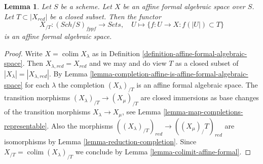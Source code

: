 \documentclass{stacks-project}
\theoremstyle{plain}
\newtheorem{lemma}[subsection]{Lemma}
\theoremstyle{definition}
\theoremstyle{remark}
\numberwithin{equation}{subsection}
\def\colim{\mathop{\mathrm{colim}}\nolimits}
\def\Sch{\mathit{Sch}}
\begin{document}
\begin{lemma}
\label{lemma-completion-affine-formal-is-affine-formal}
Let $S$ be a scheme. Let $X$ be an affine formal algebraic space over $S$.
Let $T \subset |X_{red}|$ be a closed subset. Then the functor
$$
X_{/T} : (\Sch/S)_{fppf} \longrightarrow \textit{Sets},\quad
U \longmapsto \{f : U \to X : f(|U|) \subset T\}
$$
is an affine formal algebraic space.
\end{lemma}

\begin{proof}
Write $X = \colim X_\lambda$ as in
Definition \ref{definition-affine-formal-algebraic-space}.
Then $X_{\lambda, red} = X_{red}$ and we may and do view
$T$ as a closed subset of $|X_\lambda| = |X_{\lambda, red}|$.
By Lemma \ref{lemma-completion-affine-is-affine-formal-algebraic-space}
for each $\lambda$ the completion
$(X_\lambda)_{/T}$ is an affine formal algebraic space.
The transition morphisms $(X_\lambda)_{/T} \to (X_\mu)_{/T}$ are
closed immersions as base changes of the transition morphisms
$X_\lambda \to X_\mu$, see Lemma \ref{lemma-map-completions-representable}.
Also the morphisms $((X_\lambda)_{/T})_{red} \to ((X_\mu)_/T)_{red}$
are isomorphisms by Lemma \ref{lemma-reduction-completion}.
Since $X_{/T} = \colim (X_\lambda)_{/T}$ we conclude
by Lemma \ref{lemma-colimit-affine-formal}.
\end{proof}
\end{document}
